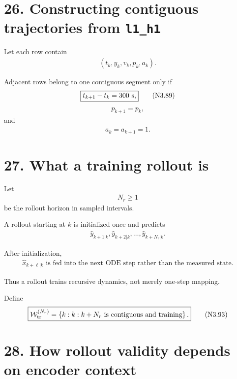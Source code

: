 \documentclass[11pt]{article}
\begin{document}
\section*{26. Constructing contiguous trajectories from \texttt{l1\_h1}}

Let each row contain
\begin{align}
(t_k,y_k,v_k,p_k,a_k).
\end{align}

Adjacent rows belong to one contiguous segment only if
\begin{align}
\boxed{t_{k+1}-t_k=300\ {\rm s},}
\tag{N3.89}
\end{align}
\begin{align}
\boxed{p_{k+1}=p_k,}
\tag{N3.90}
\end{align}
and
\begin{align}
\boxed{a_k=a_{k+1}=1.}
\tag{N3.91}
\end{align}

\section*{27. What a training rollout is}

Let
\begin{align}
N_r\ge1
\end{align}
be the rollout horizon in sampled intervals.

A rollout starting at \(k\) is initialized once and predicts
\begin{align}
\widehat y_{k+1|k},
\widehat y_{k+2|k},
\ldots,
\widehat y_{k+N_r|k}.
\end{align}

After initialization,
\begin{align}
\boxed{
\widehat x_{k+\ell|k}
\text{ is fed into the next ODE step rather than the measured state.}
}
\tag{N3.92}
\end{align}

Thus a rollout trains recursive dynamics, not merely one-step mapping.

Define
\begin{align}
\boxed{
\mathcal W_{\rm tr}^{(N_r)}
=
\left\{
k:
k:k+N_r
\text{ is contiguous and training}
\right\}.
}
\tag{N3.93}
\end{align}

\section*{28. How rollout validity depends on encoder context}
\end{document}
